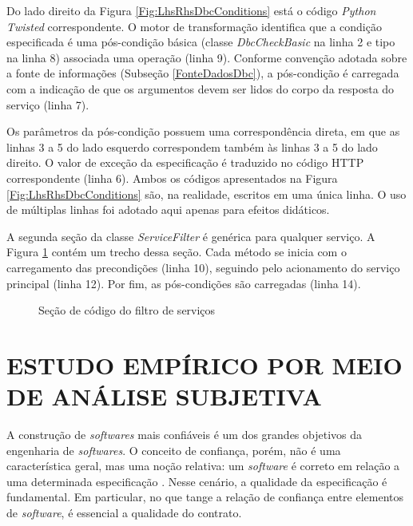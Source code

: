 Do lado direito da Figura \ref{Fig:LhsRhsDbcConditions} está o código
\emph{Python Twisted} correspondente. O motor de transformação identifica que a
condição especificada é uma pós-condição básica (classe \emph{DbcCheckBasic} na linha 2
e tipo na linha 8) associada uma operação  (linha 9). Conforme
convenção adotada sobre a fonte de informações (Subseção \ref{FonteDadosDbc}), a
pós-condição é carregada com a indicação de que os argumentos devem ser lidos do
corpo da resposta do serviço (linha 7).

Os parâmetros da pós-condição possuem uma correspondência direta, em que as
linhas 3 a 5 do lado esquerdo correspondem também às linhas 3 a 5 do lado
direito. O valor de exceção da especificação \neoidl{} é traduzido no código
HTTP correspondente (linha 6). Ambos os códigos apresentados na Figura
\ref{Fig:LhsRhsDbcConditions} são, na realidade, escritos em uma única linha.
O uso de múltiplas linhas foi adotado aqui apenas para efeitos didáticos.

A segunda seção da classe \emph{ServiceFilter} é genérica para
qualquer serviço. A Figura \ref{lst:filtrosServicosTwisted} contém um trecho
dessa seção. Cada método se inicia com o carregamento das precondições (linha
10), seguindo pelo acionamento do serviço principal (linha 12). Por fim,
as pós-condições são carregadas (linha 14).

\begin{figure}[h]
\begin{small}

\vspace{-.5cm}
\end{small} 
\caption{Seção de código do filtro de serviços}
\label{lst:filtrosServicosTwisted} 
\end{figure} 


\section{ESTUDO EMPÍRICO POR MEIO DE ANÁLISE SUBJETIVA} 
\label{analiseSubjetiva}
\vspace{-6mm}

A construção de \textit{softwares} mais confiáveis é um dos grandes objetivos da
engenharia de \textit{softwares}. O conceito de confiança, porém, não é uma
característica geral, mas uma noção relativa: um \textit{software} é correto em
relação a uma determinada especificação \cite{arnout2001net}. Nesse cenário, a
qualidade da especificação é fundamental. Em particular, no que tange a relação
de confiança entre elementos de \textit{software}, é essencial a qualidade do
contrato.


